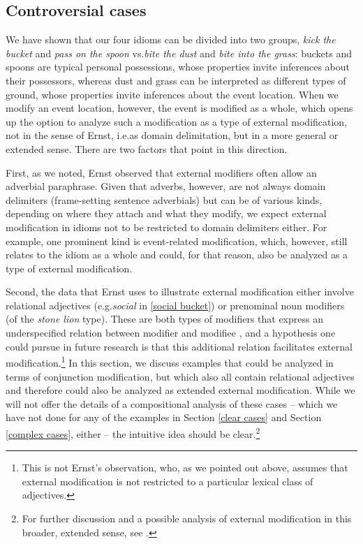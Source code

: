 \documentclass[output=paper]{langsci/langscibook}
\begin{document}
\subsection{Controversial cases} \label{controversial cases}

We have shown that our four idioms can be divided into two groups, \textit{kick the bucket} and \textit{pass on the spoon} vs.\@ \textit{bite the dust} and \textit{bite into the grass}: buckets and spoons are typical personal possessions, whose properties invite inferences about their possessors, whereas dust and grass can be interpreted as different types of ground, whose properties invite inferences about the event location. When we modify an event location, however, the event is modified as a whole, which opens up the option to analyze such a modification as a type of external modification, not in the sense of Ernst, i.e.\@ as domain delimitation, but in a more general or extended sense. There are two factors that point in this direction. 

First, as we noted, Ernst observed that external modifiers often allow an adverbial paraphrase. Given that adverbs, however, are not always domain delimiters (frame-setting sentence adverbials) but can be of various kinds, depending on where they attach and what they modify, we expect external modification in idioms not to be restricted to domain delimiters either. For example, one prominent kind is event-related modification, which, however, still relates to the idiom as a whole and could, for that reason, also be analyzed as a type of external modification.\newpage

Second, the data that Ernst uses to illustrate external modification either involve relational adjectives (e.g.\@ \textit{social} in \ref{social bucket}) or prenominal noun modifiers (of the \textit{stone lion} type). These are both types of modifiers that express an underspecified relation between modifier and modifiee \citep[see, e.g.\@,][]{mcnallyboleda04}, and a hypothesis one could pursue in future research is that this additional relation facilitates external modification.\footnote{This is not Ernst's observation, who, as we pointed out above, assumes that external modification is not restricted to a particular lexical class of adjectives.} In this section, we discuss examples that could be analyzed in terms of conjunction modification, but which also all contain relational adjectives and therefore could also be analyzed as extended external modification. While we will not offer the details of a compositional analysis of these cases -- which we have not done for any of the examples in Section \ref{clear cases} and Section \ref{complex cases}, either -- the intuitive idea should be clear.\footnote{For further discussion and a possible analysis of external modification in this broader, extended sense, see \citet{gehrkemcnally18}.}
\end{document}
